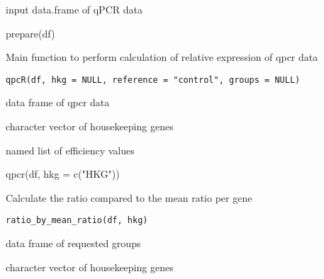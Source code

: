 \documentclass[letterpaper]{book}
\begin{document}
%
\begin{Arguments}
\begin{ldescription}
\item[\code{df}] input data.frame of qPCR data
\end{ldescription}
\end{Arguments}
%
\begin{Examples}
\begin{ExampleCode}
prepare(df)
\end{ExampleCode}
\end{Examples}
%
\begin{Description}\relax
Main function to perform calculation of relative expression of qpcr data
\end{Description}
%
\begin{Usage}
\begin{verbatim}
qpcR(df, hkg = NULL, reference = "control", groups = NULL)
\end{verbatim}
\end{Usage}
%
\begin{Arguments}
\begin{ldescription}
\item[\code{df}] data frame of qpcr data

\item[\code{hkg}] character vector of housekeeping genes

\item[\code{efficiency}] named list of efficiency values
\end{ldescription}
\end{Arguments}
%
\begin{Examples}
\begin{ExampleCode}
qpcr(df, hkg = c("HKG"))
\end{ExampleCode}
\end{Examples}
%
\begin{Description}\relax
Calculate the ratio compared to the mean ratio per gene
\end{Description}
%
\begin{Usage}
\begin{verbatim}
ratio_by_mean_ratio(df, hkg)
\end{verbatim}
\end{Usage}
%
\begin{Arguments}
\begin{ldescription}
\item[\code{df}] data frame of requested groups

\item[\code{hkg}] character vector of housekeeping genes
\end{ldescription}
\end{Arguments}
\end{document}
